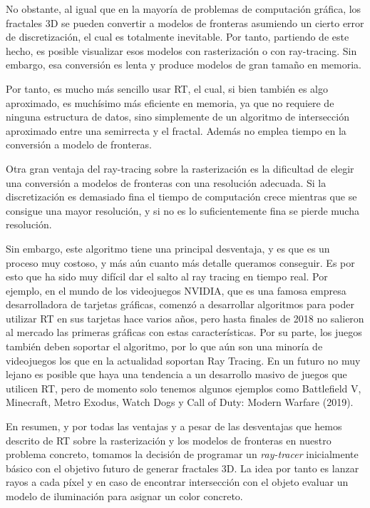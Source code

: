 No obstante, al igual que en la mayoría de problemas de computación gráfica, los fractales 3D se pueden convertir a modelos de fronteras asumiendo un cierto error de discretización, el cual es totalmente inevitable. Por tanto, partiendo de este hecho, es posible visualizar esos modelos con rasterización o con ray-tracing. Sin embargo, esa conversión es lenta y produce modelos de gran tamaño en memoria. 

Por tanto, es mucho más sencillo usar RT, el cual, si bien también es algo aproximado, es muchísimo más eficiente en memoria, ya que no requiere de ninguna estructura de datos, sino simplemente de un algoritmo de intersección aproximado entre una semirrecta y el fractal. Además no emplea tiempo en la conversión a modelo de fronteras. 

Otra gran ventaja del ray-tracing sobre la rasterización es la dificultad de elegir una conversión a modelos de fronteras con una resolución adecuada. Si la discretización es demasiado fina el tiempo de computación crece mientras que se consigue una mayor resolución, y si no es lo suficientemente fina se pierde mucha resolución.

Sin embargo, este algoritmo tiene una principal desventaja, y es que es un proceso muy costoso, y más aún cuanto más detalle queramos conseguir. Es por esto que ha sido muy difícil dar el salto al ray tracing en tiempo real. Por ejemplo, en el mundo de los videojuegos NVIDIA, que es una famosa empresa desarrolladora de tarjetas gráficas, comenzó a desarrollar algoritmos para poder utilizar RT en sus tarjetas hace varios años, pero hasta finales de 2018 no salieron al mercado las primeras gráficas con estas características. Por su parte, los juegos también deben soportar el algoritmo, por lo que aún son una minoría de videojuegos los que en la actualidad soportan Ray Tracing. En un futuro no muy lejano es posible que haya una tendencia a un desarrollo masivo de juegos que utilicen RT, pero de momento solo tenemos algunos ejemplos como Battlefield V, Minecraft, Metro Exodus, Watch Dogs y Call of Duty: Modern Warfare (2019).

En resumen, y por todas las ventajas y a pesar de las desventajas que hemos descrito de RT sobre la rasterización y los modelos de fronteras en nuestro problema concreto, tomamos la decisión de programar un \textit{ray-tracer} inicialmente básico con el objetivo futuro de generar fractales 3D. La idea por tanto es lanzar rayos a cada píxel y en caso de encontrar intersección con el objeto evaluar un modelo de iluminación para asignar un color concreto.

